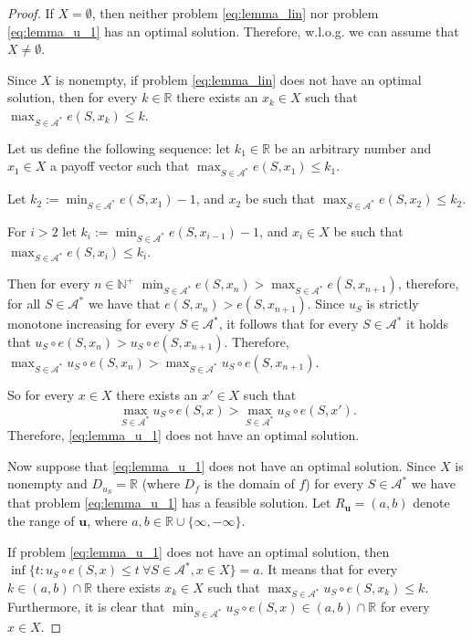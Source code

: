 \documentclass[a4paper,12pt]{article}
\theoremstyle{definition}
\theoremstyle{remark}
\begin{document}
\begin{proof}
If $X = \emptyset$, then neither problem \eqref{eq:lemma_lin} nor problem \eqref{eq:lemma_u_1} has an optimal solution.
Therefore, w.l.o.g. we can assume that $X \neq \emptyset$.

Since $X$ is nonempty, if problem \eqref{eq:lemma_lin} does not have an optimal solution, then for every $k \in \mathbb{R}$ there exists an $x_k \in X$ such that $\max_{S\in \mathcal{A}^\ast} e(S, x_k) \leq k$.

Let us define the following sequence: let $k_1\in \mathbb{R}$ be an arbitrary number and $x_1\in X$ a payoff vector such that $\max_{S\in \mathcal{A}^\ast} e(S, x_1) \leq k_1$.

Let $k_2:= \min_{S\in \mathcal{A}^\ast} e(S, x_1) -1$, and $x_2$ be such that $\max_{S\in \mathcal{A}^\ast} e(S, x_2) \leq k_2$.

For $i >2$ let $k_i:= \min_{S\in \mathcal{A}^\ast} e(S, x_{i-1}) -1$, and $x_i\in X$ be such that $\max_{S\in \mathcal{A}^*} e(S, x_i) \leq k_i$.

Then for every $n \in \mathbb{N}^+$ $\min_{S\in \mathcal{A}^\ast} e(S, x_n) > \max_{S\in \mathcal{A}^\ast} e(S, x_{n+1})$, therefore, for all $S\in \mathcal{A}^*$ we have that $e(S, x_n) > e(S, x_{n+1})$. Since $u_S$ is strictly monotone increasing for every $S\in \mathcal{A}^*$, it follows that for every $S\in \mathcal{A}^*$ it holds that $u_S \circ e(S, x_n) > u_S \circ e(S, x_{n+1})$. Therefore, $\max_{S\in \mathcal{A}^*} u_S \circ e(S, x_n) > \max_{S\in \mathcal{A}^*} u_S \circ e(S, x_{n+1})$.

So for every $x\in X$ there exists an $x' \in X$ such that 
\begin{equation*}
\max_{S\in \mathcal{A}^*} u_S \circ e(S, x) > \max_{S\in \mathcal{A}^*} u_S \circ e(S, x').
\end{equation*}
Therefore, \eqref{eq:lemma_u_1} does not have an optimal solution.

\bigskip

Now suppose that \eqref{eq:lemma_u_1} does not have an optimal solution. Since $X$ is nonempty and $D_{u_S} = \mathbb{R}$ (where $D_f$ is the domain of $f$) for every $S\in \mathcal{A}^*$ we have that problem \eqref{eq:lemma_u_1} has a feasible solution. Let $R_{\mathbf{u}} = (a, b)$ denote the range of $\mathbf{u}$, where $a, b \in \mathbb{R}\cup \{ \infty, -\infty \} $.

If problem \eqref{eq:lemma_u_1} does not have an optimal solution, then $\inf\{ t \colon u_S \circ e(S, x) \leq t \ \forall S\in \mathcal{A}^*, x\in X\} = a$. %
It means that for every $k \in (a, b) \cap \mathbb{R}$ there exists $x_k \in X$ such that $\max_{S\in \mathcal{A}^\ast} u_S \circ e(S, x_k) \leq k$.
Furthermore, it is clear that $\min_{S\in \mathcal{A}^\ast} u_S \circ e(S, x) \in (a, b) \cap \mathbb{R}$ for every $x\in X$.


\end{proof}
\end{document}
